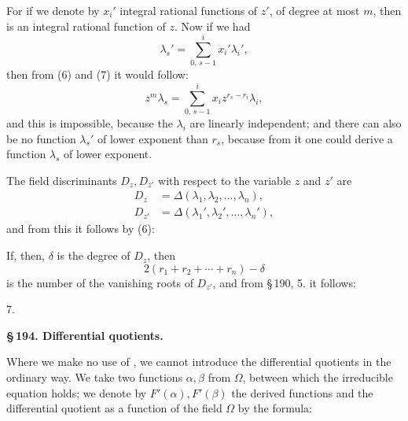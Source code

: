 For if we denote by $x_i'$ integral rational functions of $z'$, of degree at most $m$, then
is an integral rational function of $z$. Now if we had
\[
\lambda_s' = \sum_{0,\,s-1}^{i} x_i'\lambda_i',
\]
then from (6) and (7) it would follow:
\[
z^m\lambda_s = \sum_{0,\,s-1}^{i} x_i z^{r_s-r_i}\lambda_i,
\]
and this is impossible, because the $\lambda_i$ are linearly independent; and there can also be no function $\lambda_s'$ of lower exponent than $r_s$, because from it one could derive a function $\lambda_s$ of lower exponent.

The field discriminants $D_z, D_{z'}$ with respect to the variable $z$ and $z'$ are
\[
\begin{aligned}
D_z &= \Delta(\lambda_1, \lambda_2, \ldots, \lambda_n), \\
D_{z'} &= \Delta(\lambda_1', \lambda_2', \ldots, \lambda_n'),
\end{aligned}
\]
and from this it follows by (6):

If, then, $\delta$ is the degree of $D_z$, then
\[
2(r_1+r_2+\cdots+r_n) - \delta
\]
is the number of the vanishing roots of $D_{z'}$, and from \S\,190, 5. it follows:

7. 

\begin{center}
\textbf{\S\,194. Differential quotients.}
\end{center}

Where we make no use of , we cannot introduce the differential quotients in the ordinary way. We take two functions $\alpha, \beta$ from $\Omega$, between which the irreducible equation
holds; we denote by $F'(\alpha), F'(\beta)$ the derived functions and  the differential quotient as a function of the field $\Omega$ by the formula:
